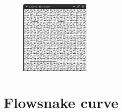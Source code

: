 \documentclass[12pt,openany,a4,usenames,dvipsnames]{book}
\begin{document}
\begin{figure}[H]
  \centering
  \includegraphics[width=0.3\textwidth,keepaspectratio]{figures/zcurve.png}
\end{figure}
\clearpage{}
\section{Flowsnake curve}
\end{document}
